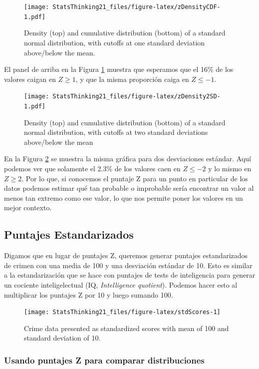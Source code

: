 \documentclass[
  12pt,
]{book}
\theoremstyle{definition}
\theoremstyle{definition}
\theoremstyle{definition}
\theoremstyle{remark}
\begin{document}
\begin{figure}
\centering
\texttt{[image: StatsThinking21\_files/figure-latex/zDensityCDF-1.pdf]}
\caption{\label{fig:zDensityCDF}Density (top) and cumulative distribution (bottom) of a standard normal distribution, with cutoffs at one standard deviation above/below the mean.}
\end{figure}

El panel de arriba en la Figura \ref{fig:zDensityCDF} muestra que esperamos que el 16\% de los valores caigan en \(Z\ge 1\), y que la misma proporción caiga en \(Z\le -1\).

\begin{figure}
\centering
\texttt{[image: StatsThinking21\_files/figure-latex/zDensity2SD-1.pdf]}
\caption{\label{fig:zDensity2SD}Density (top) and cumulative distribution (bottom) of a standard normal distribution, with cutoffs at two standard deviations above/below the mean}
\end{figure}

En la Figura \ref{fig:zDensity2SD} se muestra la misma gráfica para dos desviaciones estándar. Aquí podemos ver que solamente el 2.3\% de los valores caen en \(Z \le -2\) y lo mismo en \(Z \ge 2\). Por lo que, si conocemos el puntaje Z para un punto en particular de los datos podemos estimar qué tan probable o improbable sería encontrar un valor al menos tan extremo como ese valor, lo que nos permite poner los valores en un mejor contexto.

\hypertarget{puntajes-estandarizados}{%
\subsection{Puntajes Estandarizados}\label{puntajes-estandarizados}}

Digamos que en lugar de puntajes Z, queremos generar puntajes estandarizados de crimen con una media de 100 y una desviación estándar de 10. Esto es similar a la estandarización que se hace con puntajes de tests de inteligencia para generar un cociente inteligelectual (IQ, \emph{Intelligence quotient}). Podemos hacer esto al multiplicar los puntajes Z por 10 y luego sumando 100.

\begin{figure}
\texttt{[image: StatsThinking21\_files/figure-latex/stdScores-1]} \caption{Crime data presented as standardized scores with mean of  100 and standard deviation of 10.}\label{fig:stdScores}
\end{figure}

\hypertarget{usando-puntajes-z-para-comparar-distribuciones}{%
\subsubsection{Usando puntajes Z para comparar distribuciones}\label{usando-puntajes-z-para-comparar-distribuciones}}
\end{document}
